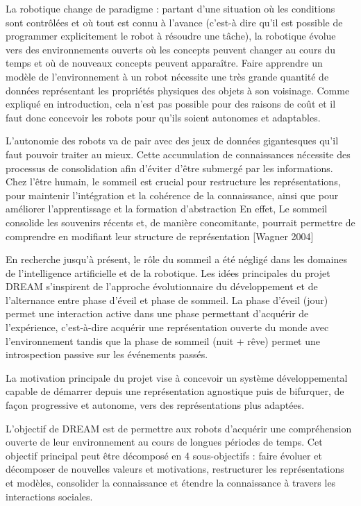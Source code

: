 \documentclass[draft]{llncs}
\newcommand*\circled[1]{\tikz[baseline=(char.base)]{\node[shape=circle,draw,inner sep=2pt] (char) {#1};}}
\begin{document}
La robotique change de paradigme : partant d'une situation où les conditions sont contrôlées et où tout est connu à l'avance (c'est-à dire qu'il est possible de programmer explicitement le robot à résoudre une tâche), la robotique évolue vers des environnements ouverts où les concepts peuvent changer au cours du temps et où de nouveaux concepts peuvent apparaître.
Faire apprendre un modèle de l'environnement à un robot nécessite une très grande quantité de données représentant les propriétés physiques des objets à son voisinage.
Comme expliqué en introduction, cela n'est pas possible pour des raisons de coût et il faut donc concevoir les robots pour qu'ils soient autonomes et adaptables.

L'autonomie des robots va de pair avec des jeux de données gigantesques qu'il faut pouvoir traiter au mieux.
Cette accumulation de connaissances nécessite des processus de consolidation afin d'éviter d'être submergé par les informations.
Chez l'être humain, le sommeil est crucial pour restructure les représentations, pour maintenir l'intégration et la cohérence de la connaissance, ainsi que pour améliorer l'apprentissage et la formation d'abstraction
En effet, Le sommeil consolide les souvenirs récents et, de manière concomitante, pourrait permettre de comprendre en modifiant leur structure de représentation
[Wagner 2004]

En recherche jusqu'à présent, le rôle du sommeil a été négligé dans les domaines de l'intelligence artificielle et de la robotique.
Les idées principales du projet DREAM s'inspirent de l'approche évolutionnaire du développement et de l'alternance entre phase d'éveil et phase de sommeil.
La phase d'éveil (jour) permet une interaction active dans une phase permettant d'acquérir de l'expérience, c'est-à-dire acquérir une représentation ouverte du monde avec l'environnement tandis que la phase de sommeil (nuit + rêve) permet une introspection passive sur les événements passés.

La motivation principale du projet vise à concevoir un système développemental capable de démarrer depuis une représentation agnostique puis de bifurquer, de façon progressive et autonome, vers des représentations plus adaptées.

L'objectif de DREAM est de permettre aux robots d'acquérir une compréhension ouverte de leur environnement au cours de longues périodes de temps.
Cet objectif principal peut être décomposé en 4 sous-objectifs : \circled{1} faire évoluer et décomposer de nouvelles valeurs et motivations, \circled{2} restructurer les représentations et modèles, \circled{2} consolider la connaissance et \circled{4} étendre la connaissance à travers les interactions sociales.
\end{document}
